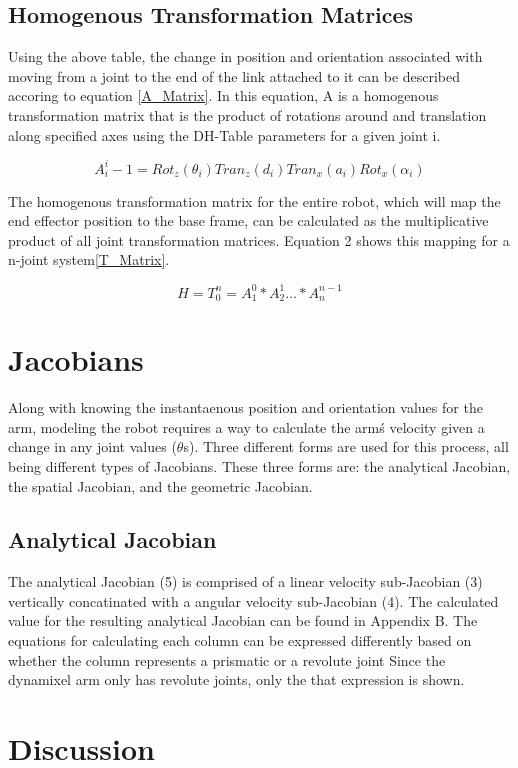 \documentclass[10pt,journal]{IEEEtran}
\begin{document}
\subsection{Homogenous Transformation Matrices}
Using the above table, the change in position and orientation
associated with moving from a joint to the end of the link
attached to it can be described accoring to equation \ref{A_Matrix}. In this
equation, A is a homogenous transformation matrix that is
the product of rotations around and translation along specified
axes using the DH-Table parameters for a given joint i.

\begin{equation}\label{A_Matrix}
	A_i^i-1=Rot_z(\theta_i)Tran_z(d_i)Tran_x(a_i)Rot_x(\alpha_i)
\end{equation}

The homogenous transformation matrix for the entire robot,
which will map the end effector position to the base frame,
can be calculated as the multiplicative product of all joint
transformation matrices. Equation 2 shows this mapping for
a n-joint system\ref{T_Matrix}.

\begin{equation}\label{T_Matrix}
	H=T_0^n = A_1^0*A_2^1 \dots*A_n^{n-1}
\end{equation}

\section{Jacobians}
Along with knowing the instantaenous position and orientation
values for the arm, modeling the robot requires a way
to calculate the arm\'s velocity given a change in any joint
values ($\theta$s). Three different forms are used for this process,
all being different types of Jacobians. These three forms are:
the analytical Jacobian, the spatial Jacobian, and the geometric
Jacobian.

\subsection{Analytical Jacobian}
The analytical Jacobian (5) is comprised of a linear velocity
sub-Jacobian (3) vertically concatinated with a angular velocity
sub-Jacobian (4). The calculated value for the resulting
analytical Jacobian can be found in Appendix B. The equations
for calculating each column can be expressed differently based
on whether the column represents a prismatic or a revolute
joint Since the dynamixel arm only has revolute joints, only
the that expression is shown.

\section{Discussion}

 
 
\end{document}
